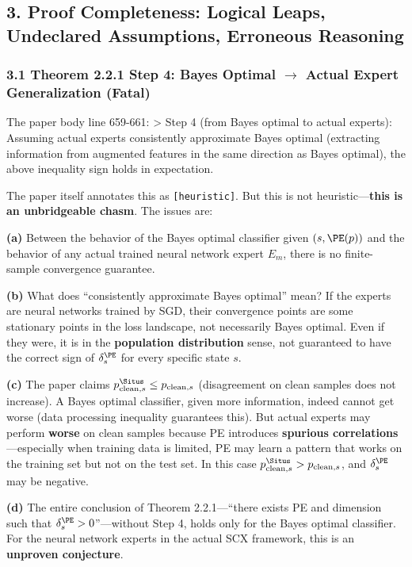 \documentclass[
  12pt,
]{article}
\begin{document}
\subsection{3. Proof Completeness: Logical Leaps, Undeclared Assumptions, Erroneous Reasoning}\label{proof-completeness}

\subsubsection{3.1 Theorem 2.2.1 Step 4: Bayes Optimal $\to$ Actual Expert Generalization (Fatal)}\label{theorem-221-step4}

The paper body line 659-661:
\textgreater{} Step 4 (from Bayes optimal to actual experts): Assuming actual experts consistently approximate Bayes optimal (extracting information from augmented features in the same direction as Bayes optimal), the above inequality sign holds in expectation.

The paper itself annotates this as \texttt{[heuristic]}. But this is not heuristic---\textbf{this is an unbridgeable chasm}. The issues are:

\textbf{(a)} Between the behavior of the Bayes optimal classifier given \((s, \PE(p))\) and the behavior of any actual trained neural network expert \(E_m\), there is no finite-sample convergence guarantee.

\textbf{(b)} What does ``consistently approximate Bayes optimal'' mean? If the experts are neural networks trained by SGD, their convergence points are some stationary points in the loss landscape, not necessarily Bayes optimal. Even if they were, it is in the \textbf{population distribution} sense, not guaranteed to have the correct sign of \(\delta_s^{\PE}\) for every specific state \(s\).

\textbf{(c)} The paper claims \(p_{\text{clean},s}^{\Situs} \leq p_{\text{clean},s}\) (disagreement on clean samples does not increase). A Bayes optimal classifier, given more information, indeed cannot get worse (data processing inequality guarantees this). But actual experts may perform \textbf{worse} on clean samples because PE introduces \textbf{spurious correlations}---especially when training data is limited, PE may learn a pattern that works on the training set but not on the test set. In this case \(p_{\text{clean},s}^{\Situs} > p_{\text{clean},s}\), and \(\delta_s^{\PE}\) may be negative.

\textbf{(d)} The entire conclusion of Theorem 2.2.1---``there exists PE and dimension such that \(\delta_s^{\PE} > 0\)''---without Step 4, holds only for the Bayes optimal classifier. For the neural network experts in the actual SCX framework, this is an \textbf{unproven conjecture}.
\end{document}

